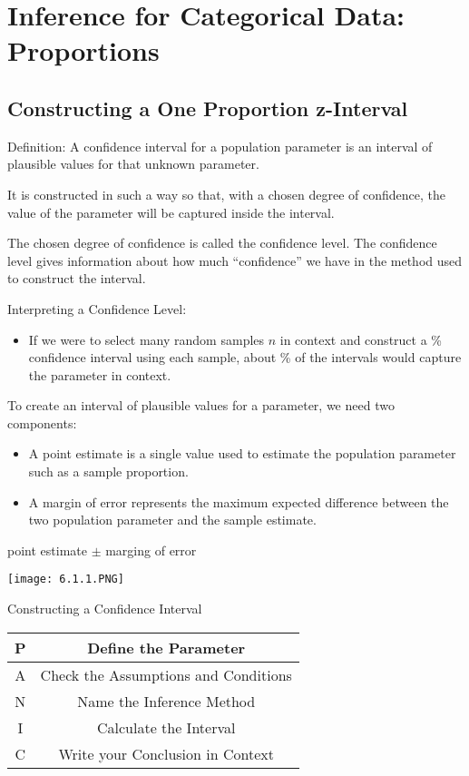 \documentclass[../stats.tex]{subfiles}
\begin{document}
\chapter{Inference for Categorical Data: Proportions}
\section{Constructing a One Proportion z-Interval}
Definition: A confidence interval for a population parameter is an interval of plausible values for that unknown parameter.

It is constructed in such a way so that, with a chosen degree of confidence, the value of the parameter will be captured inside the interval.

The chosen degree of confidence is called the confidence level. The confidence level gives information about how much ``confidence'' we have in the method used to construct the interval.

Interpreting a Confidence Level:
\begin{itemize}
    \item If we were to select many random samples {$n$ in context} and construct a \blank \% confidence interval using each sample, about \blank \% of the intervals would capture the {parameter in context}.
\end{itemize}

To create an interval of plausible values for a parameter, we need two components:
\begin{itemize}
    \item A point estimate is a single value used to estimate the population parameter such as a sample proportion.
    \item A margin of error represents the maximum expected difference between the two population parameter and the sample estimate.
\end{itemize}
\begin{center}
    point estimate $\pm$ marging of error 
\end{center}
\begin{center}
    \texttt{[image: 6.1.1.PNG]}
\end{center}

Constructing a Confidence Interval 
\begin{center}
    \begin{tabular}{c|c}
        P & Define the Parameter\\\hline 
        A & Check the Assumptions and Conditions\\\hline
        N & Name the Inference Method \\\hline
        I & Calculate the Interval \\\hline 
        C & Write your Conclusion in Context 
    \end{tabular}
\end{center}
\end{document}
